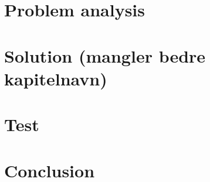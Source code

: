 %
%
%
%
% 


\pagestyle{empty} %



\cleardoublepage
{}
\pagestyle{fancy} %
\tableofcontents
\listoftodos

\cleardoublepage

\chapter{Problem analysis}






\clearpage

\chapter{Solution (mangler bedre kapitelnavn)}








\chapter{Test}
\chapter{Conclusion}

\printbibliography[heading=bibintoc]
\label{bib:mybiblio}
\appendix

